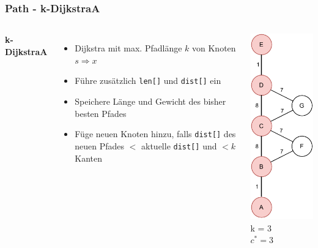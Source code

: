 \documentclass[aspectratio=169]{beamer}
\begin{document}
\begin{frame}
	\frametitle{Path - k-DijkstraA}
	\begin{columns}[c] %
		
		\textbf{k-DijkstraA}
		\begin{itemize}
			\item Dijkstra mit max. Pfadlänge $k$ von Knoten $s \Rightarrow x$
			\item Führe zusätzlich \texttt{len[]} und \texttt{dist[]} ein
			\item Speichere Länge und Gewicht des bisher besten Pfades
			\item Füge neuen Knoten hinzu, falls \texttt{dist[]} des neuen Pfades $<$ aktuelle \texttt{dist[]} und $<k$ Kanten
		\end{itemize}
		\includegraphics[scale=.5]{path_optimal.pdf}
		k = 3\\
		$c^* = 3$
		
		
	\end{columns}
	\end{frame}
	
\end{document}
